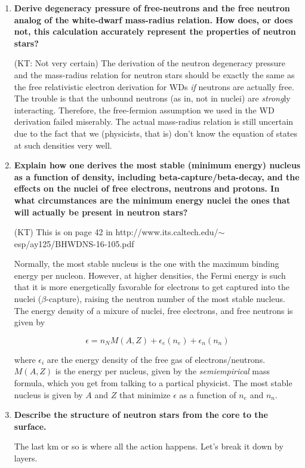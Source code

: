 \documentclass[a4paper]{article}
\begin{document}
\begin{enumerate}
\item \textbf{Derive degeneracy pressure of free-neutrons and the free neutron analog of the white-dwarf mass-radius relation. How does, or does not, this calculation accurately represent the properties of neutron stars?}

(KT: Not very certain)
The derivation of the neutron degeneracy pressure and the mass-radius relation for neutron stars should be exactly the same as the free relativistic electron derivation for WDs \textit{if} neutrons are actually free. The trouble is that the unbound neutrons (as in, not in nuclei) are \textit{strong}ly interacting. Therefore, the free-fermion assumption we used in the WD derivation failed miserably. The actual mass-radius relation is still uncertain due to the fact that we (physicists, that is) don't know the equation of states at such densities very well.  

\item \textbf{Explain how one derives the most stable (minimum energy) nucleus as a function of density, including beta-capture/beta-decay, and the effects on the nuclei of free electrons, neutrons
and protons. In what circumstances are the minimum energy nuclei the ones that will actually be present in neutron stars?}

(KT) This is on page 42 in http://www.its.caltech.edu/$\sim$esp/ay125/BHWDNS-16-105.pdf

Normally, the most stable nucleus is the one with the maximum binding energy per nucleon. However, at higher densities, the Fermi energy is such that it is more energetically favorable for electrons to get captured into the nuclei ($\beta$-capture), raising the neutron number of the most stable nucleus. The energy density of a mixure of nuclei, free electrons, and free neutrons is given by 

$$ \epsilon = n_N M(A,Z) + \epsilon_e(n_e) + \epsilon_n(n_n) $$

where $\epsilon_i$ are the energy density of the free gas of electrons/neutrons. $M(A,Z)$ is the energy per nucleus, given by the \textit{semiempirical} mass formula, which you get from talking to a partical physicist. The most stable nucleus is given by $A$ and $Z$ that minimize $\epsilon$ as a function of $n_e$ and $n_n$. 

\item \textbf{Describe the structure of neutron stars from the core to the surface.}

The last km or so is where all the action happens. Let's break it down by layers.


\end{enumerate}
\end{document}
